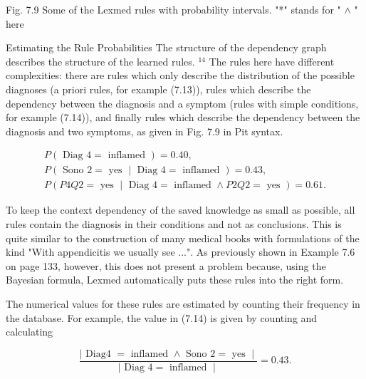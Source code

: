 \documentclass[10pt]{article}
\begin{document}
Fig. 7.9 Some of the Lexmed rules with probability intervals. "*" stands for " $\wedge$ " here

Estimating the Rule Probabilities The structure of the dependency graph describes the structure of the learned rules. ${ }^{14}$ The rules here have different complexities: there are rules which only describe the distribution of the possible diagnoses (a priori rules, for example (7.13)), rules which describe the dependency between the diagnosis and a symptom (rules with simple conditions, for example (7.14)), and finally rules which describe the dependency between the diagnosis and two symptoms, as given in Fig. 7.9 in Pit syntax.

\[
\begin{array}{r}
P(\text { Diag } 4=\text { inflamed })=0.40, \\
P(\text { Sono } 2=\text { yes } \mid \text { Diag } 4=\text { inflamed })=0.43, \\
P(P 4 Q 2=\text { yes } \mid \text { Diag } 4=\text { inflamed } \wedge P 2 Q 2=\text { yes })=0.61 . \tag{7.15}
\end{array}
\]

To keep the context dependency of the saved knowledge as small as possible, all rules contain the diagnosis in their conditions and not as conclusions. This is quite similar to the construction of many medical books with formulations of the kind "With appendicitis we usually see ...". As previously shown in Example 7.6 on page 133, however, this does not present a problem because, using the Bayesian formula, Lexmed automatically puts these rules into the right form.

The numerical values for these rules are estimated by counting their frequency in the database. For example, the value in (7.14) is given by counting and calculating

$$
\frac{\mid \text { Diag4 }=\text { inflamed } \wedge \text { Sono } 2=\text { yes } \mid}{\mid \text { Diag } 4=\text { inflamed } \mid}=0.43 .
$$
\end{document}
